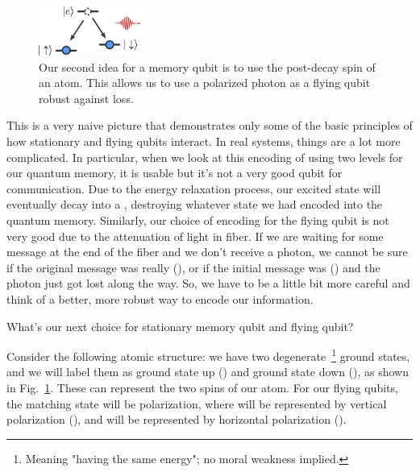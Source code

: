 
\begin{figure}[t]
    \centering
    \includegraphics[width=0.3\textwidth]{lesson13/13-4_memory-second.pdf}
    \caption[Our second idea for memory]{Our second idea for a memory qubit is to use the post-decay spin of an atom. This allows us to use a polarized photon as a flying qubit robust against loss.}
    \label{fig:13-memory-second-idea}
\end{figure}

This is a very naive picture that demonstrates only some of the basic principles of how stationary and flying qubits interact. In real systems, things are a lot more complicated. In particular, when we look at this encoding of using two levels for our quantum memory, it is usable but it's not a very good qubit for communication. Due to the energy relaxation process, our excited state will eventually decay into a , destroying whatever state we had encoded into the quantum memory. Similarly, our choice of encoding for the flying qubit is not very good due to the attenuation of light in fiber. 
If we are waiting for some message at the end of the fiber and we don't receive a photon, we cannot be sure if the original message was really  (), or if the initial message was  () and the photon just got lost along the way. So, we have to be a little bit more careful and think of a better, more robust way to encode our information.

What's our next choice for stationary memory qubit and flying qubit?

Consider the following atomic structure: we have two degenerate~\footnote{Meaning "having the same energy"; no moral weakness implied.} ground states, and we will label them as ground state up (\ket{\uparrow}) and ground state down (\ket{\downarrow}), as shown in Fig.~\ref{fig:13-memory-second-idea}. These can represent the two spins of our atom.
For our flying qubits, the matching state will be polarization, where  will be represented by vertical polarization (), and  will be represented by horizontal polarization (). 


